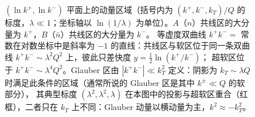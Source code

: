 \begin{figure}[htbp]
\caption{$(\ln k^+,\ln k^-)$ 平面上的动量区域（括号内为 $(k^+,k^-,k_T)/Q$ 的标度，$\lambda\ll1$；坐标轴以 $\ln(1/\lambda)$ 为单位）。$A$（$n$）共线区的大分量为 $k^+$，$B$（$\bar n$）共线区的大分量为 $k^-$。
等虚度双曲线 $k^+k^-=$ 常数在对数坐标中是斜率为 $-1$ 的直线：共线区与软区位于同一条双曲线 $k^+k^-\sim\lambda^2Q^2$ 上，彼此只差快度 $y=\frac12\ln(k^+/k^-)$；
超软区位于 $k^+k^-\sim\lambda^4Q^2$。Glauber 区由 $|k^+k^-|\ll k_T^2$ 定义：阴影为 $k_T\sim\lambda Q$ 时满足此条件的区域（通常所说的 Glauber 区是其中 $k^\pm\ll Q$ 的软部分），
其典型标度 $(\lambda^2,\lambda^2,\lambda)$ 在本图中的投影与超软区重合（红框），二者只在 $k_T$ 上不同：Glauber 动量以横动量为主，$k^2\approx-k_T^2$。}
\label{fig:momentum-regions}
\end{figure}

